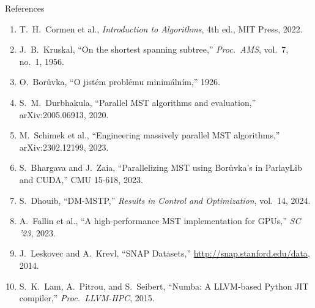 \documentclass[aspectratio=169, 11pt]{beamer}
\begin{document}
\begin{frame}{References}
\scriptsize
\begin{enumerate}
    \item T.~H.\ Cormen et al., \textit{Introduction to Algorithms}, 4th ed., MIT Press, 2022.
    \item J.~B.\ Kruskal, ``On the shortest spanning subtree,'' \textit{Proc.\ AMS}, vol.~7, no.~1, 1956.
    \item O.\ Bor\r{u}vka, ``O jist\'{e}m probl\'{e}mu minim\'{a}ln\'{i}m,'' 1926.
    \item S.~M.\ Durbhakula, ``Parallel MST algorithms and evaluation,'' arXiv:2005.06913, 2020.
    \item M.\ Schimek et al., ``Engineering massively parallel MST algorithms,'' arXiv:2302.12199, 2023.
    \item S.\ Bhargava and J.\ Zaia, ``Parallelizing MST using Bor\r{u}vka's in ParlayLib and CUDA,'' CMU 15-618, 2023.
    \item S.\ Dhouib, ``DM-MSTP,'' \textit{Results in Control and Optimization}, vol.~14, 2024.
    \item A.\ Fallin et al., ``A high-performance MST implementation for GPUs,'' \textit{SC '23}, 2023.
    \item J.\ Leskovec and A.\ Krevl, ``SNAP Datasets,'' \url{http://snap.stanford.edu/data}, 2014.
    \item S.~K.\ Lam, A.\ Pitrou, and S.\ Seibert, ``Numba: A LLVM-based Python JIT compiler,'' \textit{Proc.\ LLVM-HPC}, 2015.
\end{enumerate}
\end{frame}
\end{document}
